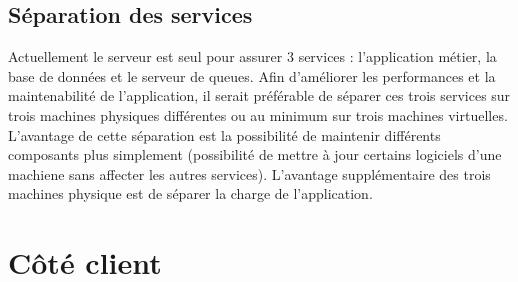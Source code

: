 

	\subsection{Séparation des services} %
	\label{sub:separation_des_services}
	
		Actuellement le serveur est seul pour assurer 3 services : l'application métier, la base de données et le serveur de queues. Afin d'améliorer les performances et la maintenabilité de l'application, il serait préférable de séparer ces trois services sur trois machines physiques différentes ou au minimum sur trois machines virtuelles. L'avantage de cette séparation est la possibilité de maintenir différents composants plus simplement (possibilité de mettre à jour certains logiciels d'une machiene sans affecter les autres services). L'avantage supplémentaire des trois machines physique est de séparer la charge de l'application.


\section{Côté client}
